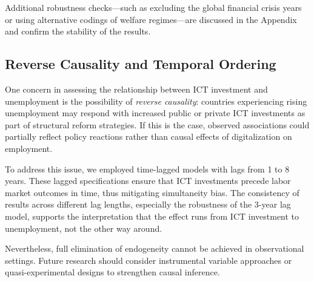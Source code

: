 Additional robustness checks—such as excluding the global financial crisis years or using alternative 
codings of welfare regimes—are discussed in the Appendix and confirm the stability of the results.

\subsection{Reverse Causality and Temporal Ordering}

One concern in assessing the relationship between ICT investment and unemployment is the possibility 
of \textit{reverse causality}: countries experiencing rising unemployment may respond with increased 
public or private ICT investments as part of structural reform strategies. If this is the case, 
observed associations could partially reflect policy reactions rather than causal effects of 
digitalization on employment.

To address this issue, we employed time-lagged models with lags from 1 to 8 years. These lagged 
specifications ensure that ICT investments precede labor market outcomes in time, thus mitigating 
simultaneity bias. The consistency of results across different lag lengths, especially the robustness 
of the 3-year lag model, supports the interpretation that the effect runs from ICT investment to 
unemployment, not the other way around.

Nevertheless, full elimination of endogeneity cannot be achieved in observational settings. Future 
research should consider instrumental variable approaches or quasi-experimental designs to strengthen 
causal inference.
